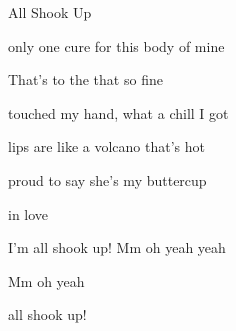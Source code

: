 \begin{SBSong}{All Shook Up}
\begin{SBVerse}
 	 only one cure for this body of mine

 	That's to   the   that  so fine

     touched my hand, what a chill I got

     lips are like a volcano that's hot

     proud to say she's my buttercup
    
     in love 

    I'm all shook up! Mm oh  yeah  yeah

    Mm oh  yeah 	 
	 
     all shook up!   	 
  \end{SBVerse}
\end{SBSong}
